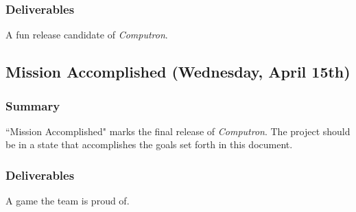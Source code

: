 \subsubsection*{Deliverables}
A fun release candidate of \textit{Computron}.

\subsection{Mission Accomplished (Wednesday, April 15th)}

\subsubsection*{Summary}
``Mission Accomplished" marks the final release of \textit{Computron}. The project should 
be in a state that accomplishes the goals set forth in this document.

\subsubsection*{Deliverables}
A game the team is proud of.